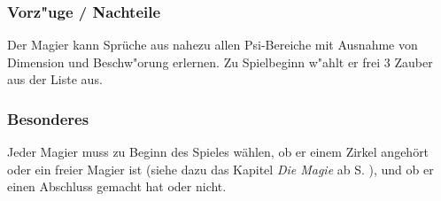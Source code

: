 \subsubsection{Vorz"uge / Nachteile}
\par Der Magier kann Sprüche aus nahezu allen Psi-Bereiche
mit Ausnahme von Dimension und Beschw"orung erlernen. Zu Spielbeginn
w"ahlt er frei 3 Zauber aus der Liste aus.
\subsubsection{Besonderes}
\par Jeder Magier muss zu Beginn des Spieles wählen, ob er einem
Zirkel angehört oder ein freier Magier ist (siehe dazu das Kapitel
\textit{Die Magie} ab S. \pageref{spruchmagie}), und ob er einen Abschluss
gemacht hat oder nicht.
